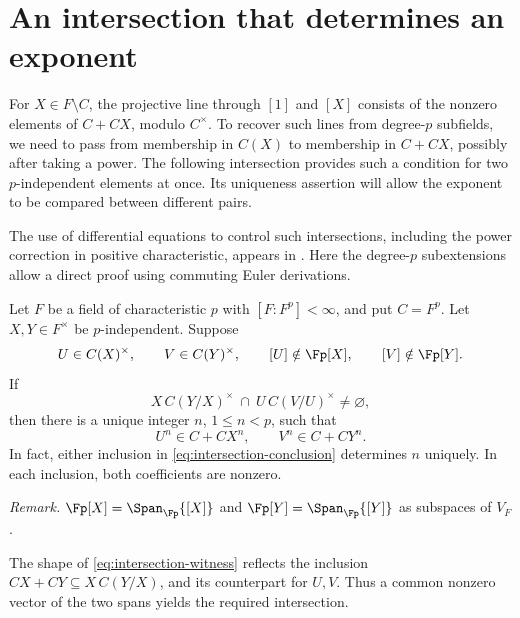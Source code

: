 \section{An intersection that determines an exponent}
\label{sec:intersection}

For $X\in F\setminus C$, the projective line through $[1]$ and $[X]$
consists of the nonzero elements of $C+CX$, modulo $C^\times$.
To recover such lines from degree-$p$
subfields, we need to pass from membership in $C(X)$ to membership in
$C+CX$, possibly after taking a power.  The following intersection provides such a
condition for two $p$-independent elements at once.  Its uniqueness assertion
will allow the exponent to be compared between different pairs.

The use of differential equations to control such intersections, including
the power correction in positive characteristic, appears in
\citet[Sections~3.4--3.5]{CadoretPirutka2021}.  Here the degree-$p$
subextensions allow a direct proof using commuting Euler derivations.

\begin{proposition}
\label{prop:intersection}
Let $F$ be a field of characteristic $p$ with $[F:F^p]<\infty$, and put
$C=F^p$.  Let $X,Y\in F^\times$ be $p$-independent.  Suppose
\[
 U\in C(X)^\times,\qquad V\in C(Y)^\times,
 \qquad [U]\notin\Fp[X],\qquad [V]\notin\Fp[Y].
\]
If
\begin{equation}
\label{eq:intersection-witness}
 X\,C(Y/X)^\times\ \cap\ U\,C(V/U)^\times\ne\varnothing,
\end{equation}
then there is a unique integer $n$, $1\le n<p$, such that
\begin{equation}
\label{eq:intersection-conclusion}
 U^n\in C+CX^n,\qquad V^n\in C+CY^n.
\end{equation}
In fact, either inclusion in \eqref{eq:intersection-conclusion} determines
$n$ uniquely.  In each inclusion, both coefficients are nonzero.
\end{proposition}

\noindent\textit{Remark.} $\Fp[X]=\Span_{\Fp}\{[X]\}$ and $\Fp[Y]=\Span_{\Fp}\{[Y]\}$ as subspaces of $V_F$.


The shape of \eqref{eq:intersection-witness} reflects the inclusion
$CX+CY\subseteq X\,C(Y/X)$, and its counterpart for $U,V$.
Thus a common nonzero vector of the two spans yields the required intersection.

